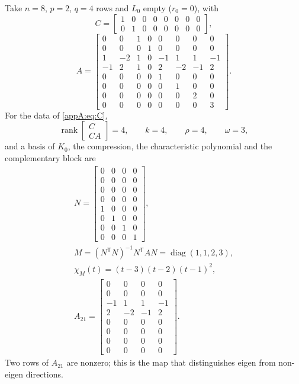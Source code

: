 \documentclass[journal]{IEEEtran}
\theoremstyle{plainn}
\theoremstyle{remark}
\newcommand{\rank}{\operatorname{rank}}
\begin{document}
Take $n=8$, $p=2$, $q=4$ rows and $L_0$ empty ($r_0=0$), with
\begin{equation}
\label{appA:eq:C}
C=\begin{bmatrix}1&0&0&0&0&0&0&0\\0&1&0&0&0&0&0&0\end{bmatrix},
\end{equation}
\begin{equation}
\label{appA:eq:A}
A=\begin{bmatrix}
0&0&1&0&0&0&0&0\\0&0&0&1&0&0&0&0\\
1&-2&1&0&-1&1&1&-1\\-1&2&1&0&2&-2&-1&2\\
0&0&0&0&1&0&0&0\\0&0&0&0&0&1&0&0\\
0&0&0&0&0&0&2&0\\0&0&0&0&0&0&0&3
\end{bmatrix}.
\end{equation}
For the data of \eqref{appA:eq:C},
\begin{equation}\label{appA:eq:rank}
\rank\begin{bmatrix}C\\ CA\end{bmatrix}=4,\qquad k=4,\qquad \rho=4,\qquad \omega=3,
\end{equation}
and a basis of $K_0$, the compression, the characteristic polynomial and the complementary block are
\begin{gather}
\label{appA:eq:N}
N=\begin{bmatrix}
0&0&0&0\\0&0&0&0\\0&0&0&0\\0&0&0&0\\
1&0&0&0\\0&1&0&0\\0&0&1&0\\0&0&0&1
\end{bmatrix},\\
M=(N^{\mathsf T}N)^{-1}N^{\mathsf T}AN=\operatorname{diag}(1,1,2,3),\\
\label{appA:eq:chi}
\chi_M(t)=(t-3)(t-2)(t-1)^2,\\
A_{21}=\begin{bmatrix}
0&0&0&0\\0&0&0&0\\-1&1&1&-1\\2&-2&-1&2\\
0&0&0&0\\0&0&0&0\\0&0&0&0\\0&0&0&0
\end{bmatrix}.
\end{gather}
Two rows of $A_{21}$ are nonzero; this is the map that distinguishes eigen from non-eigen directions.
\end{document}

